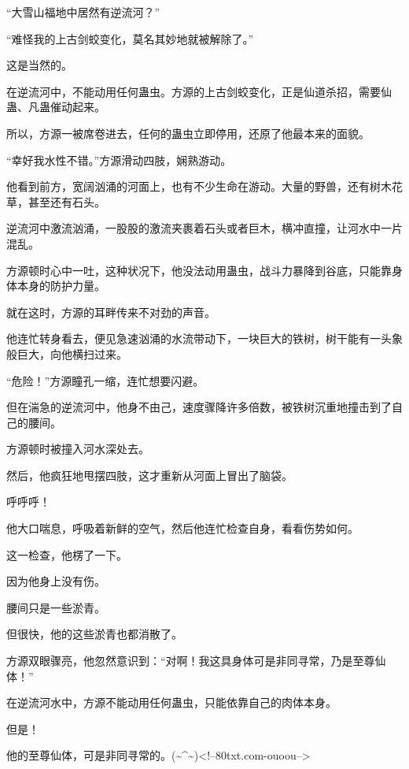 \begin{this_body}
“大雪山福地中居然有逆流河？”

“难怪我的上古剑蛟变化，莫名其妙地就被解除了。”

这是当然的。

在逆流河中，不能动用任何蛊虫。方源的上古剑蛟变化，正是仙道杀招，需要仙蛊、凡蛊催动起来。

所以，方源一被席卷进去，任何的蛊虫立即停用，还原了他最本来的面貌。

“幸好我水性不错。”方源滑动四肢，娴熟游动。

他看到前方，宽阔汹涌的河面上，也有不少生命在游动。大量的野兽，还有树木花草，甚至还有石头。

逆流河中激流汹涌，一股股的激流夹裹着石头或者巨木，横冲直撞，让河水中一片混乱。

方源顿时心中一吐，这种状况下，他没法动用蛊虫，战斗力暴降到谷底，只能靠身体本身的防护力量。

就在这时，方源的耳畔传来不对劲的声音。

他连忙转身看去，便见急速汹涌的水流带动下，一块巨大的铁树，树干能有一头象般巨大，向他横扫过来。

“危险！”方源瞳孔一缩，连忙想要闪避。

但在湍急的逆流河中，他身不由己，速度骤降许多倍数，被铁树沉重地撞击到了自己的腰间。

方源顿时被撞入河水深处去。

然后，他疯狂地甩摆四肢，这才重新从河面上冒出了脑袋。

呼呼呼！

他大口喘息，呼吸着新鲜的空气，然后他连忙检查自身，看看伤势如何。

这一检查，他楞了一下。

因为他身上没有伤。

腰间只是一些淤青。

但很快，他的这些淤青也都消散了。

方源双眼骤亮，他忽然意识到：“对啊！我这具身体可是非同寻常，乃是至尊仙体！”

在逆流河水中，方源不能动用任何蛊虫，只能依靠自己的肉体本身。

但是！

他的至尊仙体，可是非同寻常的。(\~{}\^{}\~{})<!--80txt.com-ouoou-->

\end{this_body}

